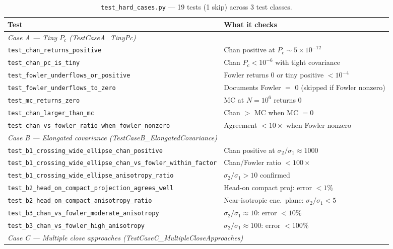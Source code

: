 \documentclass[11pt]{article}
\begin{document}
\begin{table}[htb]
\centering
\small
\caption{\texttt{test\_hard\_cases.py} — 19 tests (1 skip) across 3 test classes.}
\label{tab:test_hard}
\begin{tabular}{lp{10cm}}
  \toprule
  Test & What it checks \\
  \midrule
  \multicolumn{2}{l}{\textit{Case A — Tiny $P_c$ (TestCaseA\_TinyPc)}} \\
  \texttt{test\_chan\_returns\_positive} & Chan positive at $P_c \sim 5\times10^{-12}$ \\
  \texttt{test\_chan\_pc\_is\_tiny} & Chan $P_c < 10^{-6}$ with tight covariance \\
  \texttt{test\_fowler\_underflows\_or\_positive} & Fowler returns 0 or tiny positive $< 10^{-4}$ \\
  \texttt{test\_fowler\_underflows\_to\_zero} & Documents Fowler $=$ 0 (skipped if Fowler nonzero) \\
  \texttt{test\_mc\_returns\_zero} & MC at $N=10^6$ returns 0 \\
  \texttt{test\_chan\_larger\_than\_mc} & Chan $>$ MC when MC $= 0$ \\
  \texttt{test\_chan\_vs\_fowler\_ratio\_when\_fowler\_nonzero} & Agreement $< 10\times$ when Fowler nonzero \\
  \midrule
  \multicolumn{2}{l}{\textit{Case B — Elongated covariance (TestCaseB\_ElongatedCovariance)}} \\
  \texttt{test\_b1\_crossing\_wide\_ellipse\_chan\_positive} & Chan positive at $\sigma_2/\sigma_1 \approx 1000$ \\
  \texttt{test\_b1\_crossing\_wide\_ellipse\_chan\_vs\_fowler\_within\_factor} & Chan/Fowler ratio $< 100\times$ \\
  \texttt{test\_b1\_crossing\_wide\_ellipse\_anisotropy\_ratio} & $\sigma_2/\sigma_1 > 10$ confirmed \\
  \texttt{test\_b2\_head\_on\_compact\_projection\_agrees\_well} & Head-on compact proj: error $< 1\%$ \\
  \texttt{test\_b2\_head\_on\_compact\_anisotropy\_ratio} & Near-isotropic enc.\ plane: $\sigma_2/\sigma_1 < 5$ \\
  \texttt{test\_b3\_chan\_vs\_fowler\_moderate\_anisotropy} & $\sigma_2/\sigma_1 \approx 10$: error $< 10\%$ \\
  \texttt{test\_b3\_chan\_vs\_fowler\_high\_anisotropy} & $\sigma_2/\sigma_1 \approx 100$: error $< 100\%$ \\
  \midrule
  \multicolumn{2}{l}{\textit{Case C — Multiple close approaches (TestCaseC\_MultipleCloseApproaches)}} \\

\end{tabular}
\end{table}
\end{document}
